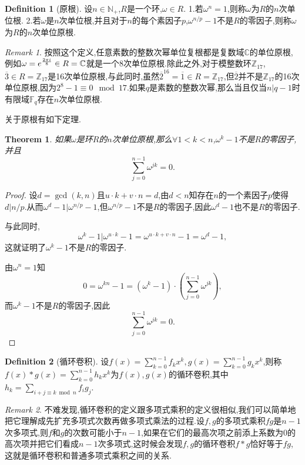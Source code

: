 \documentclass{ctexart}
\newtheorem{theorem}{Theorem}
\theoremstyle{remark}
\newtheorem{remark}{Remark}
\theoremstyle{definition}
\newtheorem{definition}{Definition}[section]
\newtheorem{proof}{Proof}
\begin{document}
\begin{definition}[原根]
设$n\in\mathbb{N}_+$,$R$是一个环,$\omega\in R$.
 1.若$\omega^n=1$,则称$\omega$为$R$的$n$次单位根.
 2.若$\omega$是$n$次单位根,并且对于$n$的每个素因子$p$,$\omega^{n/p}-1$不是$R$的零因子,则称$\omega$为$R$的$n$次单位原根.
\end{definition}
\begin{remark}
按照这个定义,任意素数的整数次幂单位复根都是复数域$\mathbb{C}$的单位原根,例如$\omega=e^{{2\pi i\over 8}}\in R=\mathbb{C}$就是一个8次单位原根.除此之外,对于模整数环$\mathbb{Z}_{17}$,$\overline{3}\in R=\mathbb{Z}_{17}$是16次单位原根,与此同时,虽然$\overline{2}^{16}=\overline{1}\in R=\mathbb{Z}_{17}$,但$\overline{2}$并不是$\mathbb{Z}_{17}$的16次单位原根,因为$2^8-1\equiv 0\mod 17$.如果$q$是素数的整数次幂,那么当且仅当$n|q-1$时有限域$\mathbb{F}_q$存在$n$次单位原根.
\end{remark}
关于原根有如下定理.
\begin{theorem}\label{th:primitiveroot}
如果$\omega$是环$R$的$n$次单位原根,那么$\forall 1<k<n$,$\omega^k-1$不是$R$的零因子,并且$$\sum_{j=0}^{n-1}\omega^{jk}=0.$$
\end{theorem}
\begin{proof}
设$d=\gcd(k,n)$且$u\cdot k+v\cdot n=d$,由$d<n$知存在$n$的一个素因子$p$使得$d|n/p$.从而$\omega^d-1|\omega^{n/p}-1$,但$\omega^{n/p}-1$不是$R$的零因子,因此$\omega^d-1$也不是$R$的零因子.

与此同时,$$\omega^k-1|\omega^{u\cdot k}-1=\omega^{u\cdot k+v\cdot n}-1=\omega^d-1,$$这就证明了$\omega^k-1$不是$R$的零因子.

由$\omega^n=1$知$$0=\omega^{kn}-1=(\omega^k-1)\cdot(\sum_{j=0}^{n-1}\omega^{jk}),$$而$\omega^k-1$不是$R$的零因子,因此$$\sum_{j=0}^{n-1}\omega^{jk}=0.$$
\end{proof}

\begin{definition}[循环卷积]
设$f(x)=\sum\limits_{k=0}^{n-1}f_kx^k,g(x)=\sum\limits_{k=0}^{n-1}g_kx^k$,则称$f(x)*g(x)=\sum\limits_{k=0}^{n-1}h_kx^k$为$f(x),g(x)$的循环卷积,其中$h_k=\sum\limits_{i+j\equiv k\bmod n}f_ig_j$.
\end{definition}
\begin{remark}
不难发现,循环卷积的定义跟多项式乘积的定义很相似,我们可以简单地把它理解成先扩充多项式次数再做多项式乘法的过程.设$f,g$的多项式乘积$fg$是$n-1$次多项式,则$f$和$g$的次数可能小于$n-1$,如果在它们的最高次项之前添上系数为0的高次项并把它们看成$n-1$次多项式,这时候会发现$f,g$的循环卷积$f*g$恰好等于$fg$,这就是循环卷积和普通多项式乘积之间的关系.
\end{remark}
\end{document}
